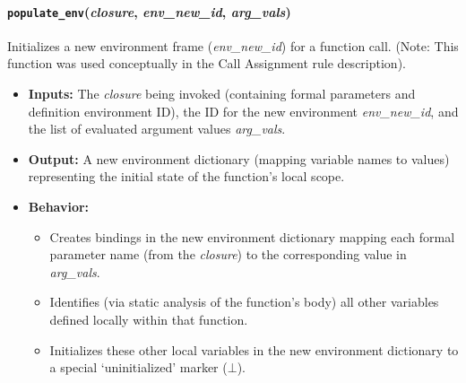 \documentclass[runningheads]{llncs}
\begin{document}
\paragraph{\texttt{populate\_env}(\textit{closure}, \textit{env\_new\_id}, \textit{arg\_vals})}
Initializes a new environment frame (\textit{env\_new\_id}) for a function call.
(Note: This function was used conceptually in the Call Assignment rule
description).
\begin{itemize}
	\item \textbf{Inputs:} The \textit{closure} being invoked (containing formal
	      parameters and definition environment ID), the ID for the new environment
	      \textit{env\_new\_id}, and the list of evaluated argument values
	      \textit{arg\_vals}.
	\item \textbf{Output:} A new environment dictionary (mapping variable names
	      to values) representing the initial state of the function's local scope.
	\item \textbf{Behavior:}
	      \begin{itemize}
		      \item Creates bindings in the new environment dictionary mapping
		            each formal parameter name (from the \textit{closure}) to the corresponding
		            value in \textit{arg\_vals}.
		      \item Identifies (via static analysis of the function's body) all
		            other variables defined locally within that function.
		      \item Initializes these other local variables in the new
		            environment dictionary to a special `uninitialized' marker ($\bot$).
	      \end{itemize}
\end{itemize}
\end{document}
